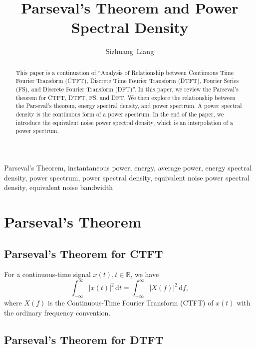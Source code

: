 \documentclass[journal,twoside]{IEEEtran}
\newcommand{\dd}{\,\mathrm{d}}
\begin{document}
\title{Parseval's Theorem and Power Spectral Density}

\author{Sizhuang~Liang}

\maketitle

\begin{abstract}

This paper is a continuation of ``Analysis of Relationship between Continuous Time Fourier Transform (CTFT), Discrete Time Fourier
Transform (DTFT), Fourier Series (FS), and Discrete Fourier Transform (DFT)''. In this paper, we review the Parseval's theorem for CTFT, DTFT, FS, and DFT. We then explore the relationship between the Parseval's theorem, energy spectral density, and power spectrum. A power spectral density is the continuous form of a power spectrum. In the end of the paper, we introduce the equivalent noise power spectral density, which is an interpolation of a power spectrum.

\end{abstract}

\begin{IEEEkeywords}
Parseval's Theorem, instantaneous power, energy, average power, energy spectral density, power spectrum, power spectral density, equivalent noise power spectral density, equivalent noise bandwidth
\end{IEEEkeywords}

\section{Parseval's Theorem}

\subsection{Parseval's Theorem for CTFT}

For a continuous-time signal $x(t), t\in\mathbb{R}$, we have
\begin{equation}
\int_{-\infty}^{\infty}|x(t)|^2\dd t = \int_{-\infty}^{\infty}|X(f)|^2\dd f,\label{eqn:parseval_CTFT}
\end{equation}
where $X(f)$ is the Continuous-Time Fourier Transform (CTFT) of $x(t)$ with the ordinary frequency convention.

\subsection{Parseval's Theorem for DTFT}
\end{document}
